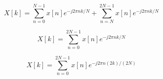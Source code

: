 \documentclass[fleqn]{article}
\begin{document}
\begin{enumerate}
\begin{enumerate}[nolistsep]
			\begin{equation*}
				X[k] = \sum_{n=0}^{N-1}{x[n]e^{-j2{\pi}nk/N}} + \sum_{n=N}^{2N-1}{x[n]e^{-j2{\pi}nk/N}}
			\end{equation*}
			
			\begin{equation*}
				X[k] = \sum_{n=0}^{2N-1}{x[n]e^{-j2{\pi}nk/N}}
			\end{equation*}
			
			\begin{equation*}
				X[k] = \sum_{n=0}^{2N-1}{x[n]e^{-j2{\pi}n(2k)/(2N)}}
			\end{equation*}
		\end{enumerate}
	\end{enumerate}
	
	
	
\end{document}
